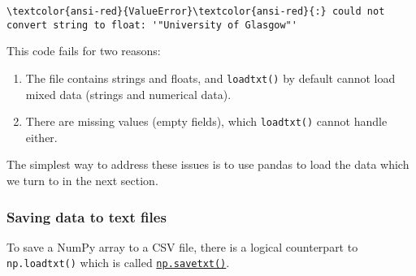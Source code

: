 \documentclass{scrartcl}
\providecommand{\tightlist}{%
      \setlength{\itemsep}{0pt}\setlength{\parskip}{0pt}}
\begin{document}
    \begin{Verbatim}[commandchars=\\\{\}, frame=single, framerule=2mm, rulecolor=\color{outerrorbackground}]
\textcolor{ansi-red}{ValueError}\textcolor{ansi-red}{:} could not convert string to float: '"University of Glasgow"'

    \end{Verbatim}

    This code fails for two reasons:

\begin{enumerate}
\def\labelenumi{\arabic{enumi}.}
\tightlist
\item
  The file contains strings and floats, and \texttt{loadtxt()} by
  default cannot load mixed data (\eg strings and numerical data).
\item
  There are missing values (empty fields), which \texttt{loadtxt()}
  cannot handle either.
\end{enumerate}

The simplest way to address these issues is to use pandas to load the
data which we turn to in the next section.

    \hypertarget{saving-data-to-text-files}{%
\subsubsection{Saving data to text
files}\label{saving-data-to-text-files}}

To save a NumPy array to a CSV file, there is a logical counterpart to
\texttt{np.loadtxt()} which is called
\href{https://numpy.org/doc/stable/reference/generated/numpy.savetxt.html}{\texttt{np.savetxt()}}.
\end{document}
